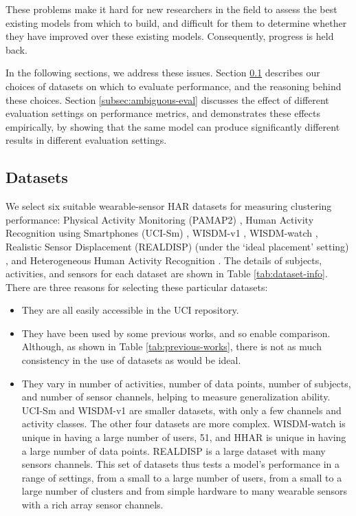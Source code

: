 \documentclass[wcp]{jmlr}
\begin{document}
These problems make it hard for new researchers in the field to assess the best existing models from which to build, and difficult for them to determine whether they have improved over these existing models. Consequently, progress is held back. 

In the following sections, we address these issues. Section \ref{subsec:datasets} describes our choices of datasets on which to evaluate performance, and the reasoning behind these choices. Section \ref{subsec:ambiguous-eval} discusses the effect of different evaluation settings on perfor\-mance metrics, and demonstrates these effects empirically, by showing that the same model can produce significantly different results in different evaluation settings.

\subsection{Datasets} \label{subsec:datasets}


We select six suitable wearable-sensor HAR datasets for measuring clustering performance: Physical Activity Monitoring (PAMAP2) \citep{reiss2012introducing}, Human Activity Recognition using Smartphones (UCI-Sm) \citep{anguita2013public}, WISDM-v1 \citep{kwapisz2011activity}, WISDM-watch \citep{weiss2019smartphone}, Realistic Sensor Displacement (REALDISP) (under the `ideal placement' setting) \citep{banos2012benchmark}, and Heterogeneous Human Activity Recognition \citep{stisen2015smart}. The details of subjects, activities, and sensors for each dataset are shown in Table \ref{tab:dataset-info}. There are three reasons for selecting these particular datasets:
\begin{itemize}
    \item They are all easily accessible in the UCI repository.
    \item They have been used by some previous works, and so enable comparison. Although, as shown in Table \ref{tab:previous-works}, there is not as much consistency in the use of datasets as would be ideal. 
    \item They vary in number of activities, number of data points, number of subjects, and number of sensor channels, helping to measure generalization ability. UCI-Sm and WISDM-v1 are smaller datasets, with only a few channels and activity classes.
The other four datasets are more complex. WISDM-watch is unique in having a large number of users, 51, and HHAR is unique in having a large number of data points. REALDISP is a large dataset with many sensors channels. This set of datasets thus tests a model's performance in a range of settings, from a small to a large number of users, from a small to a large number of clusters and from simple hardware to many wearable sensors with a rich array sensor channels. 
\end{itemize}
\end{document}
